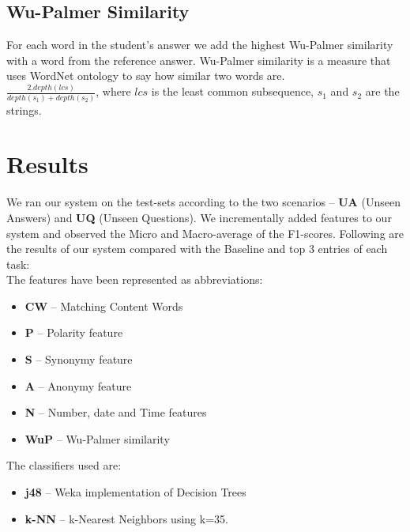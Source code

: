 \documentclass[a4paper]{article}
\begin{document}
\subsection{Wu-Palmer Similarity}
For each word in the student's answer we add the highest Wu-Palmer similarity with a word from the reference answer. Wu-Palmer similarity is a measure that uses WordNet ontology to say how similar two words are.\cite{wup} \\

$ \frac{2 . depth(lcs)}{depth(s_1) + depth(s_2)}$, where $lcs$ is the least common subsequence, $s_1$ and $s_2$ are the strings.
\section{Results}
We ran our system on the test-sets according to the two scenarios -- \textbf{UA} (Unseen Answers) and \textbf{UQ} (Unseen Questions). We incrementally added features to our system and observed the Micro and Macro-average of the F1-scores. Following are the results of our system compared with the Baseline and top 3 entries of each task:\\ 
The features have been represented as abbreviations:
\begin{itemize}
	\item \textbf{CW} -- Matching Content Words
	\item \textbf{P} -- Polarity feature
	\item \textbf{S} -- Synonymy feature
	\item \textbf{A} -- Anonymy feature
	\item \textbf{N} -- Number, date and Time features
	\item \textbf{WuP} -- Wu-Palmer similarity
\end{itemize}
The classifiers used are: 
\begin{itemize}
	\item \textbf{j48} -- Weka implementation of Decision Trees
	\item \textbf{k-NN} -- k-Nearest Neighbors using k=35.
\end{itemize}
\end{document}
